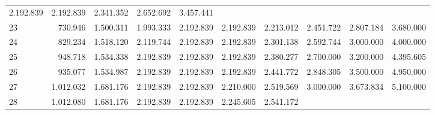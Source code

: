 \begin{tabular}{llllllllll}
  \multicolumn{1}{r}{2.192.839} &
  \multicolumn{1}{r}{2.192.839} &
  \multicolumn{1}{r}{2.341.352} &
  \multicolumn{1}{r}{2.652.692} &
  \multicolumn{1}{r}{3.457.441} \\
\multicolumn{1}{l}{\hspace{1em}23} &
  \multicolumn{1}{|r}{730.946} &
  \multicolumn{1}{r}{1.500.311} &
  \multicolumn{1}{r}{1.993.333} &
  \multicolumn{1}{r}{2.192.839} &
  \multicolumn{1}{r}{2.192.839} &
  \multicolumn{1}{r}{2.213.012} &
  \multicolumn{1}{r}{2.451.722} &
  \multicolumn{1}{r}{2.807.184} &
  \multicolumn{1}{r}{3.680.000} \\
\multicolumn{1}{l}{\hspace{1em}24} &
  \multicolumn{1}{|r}{829.234} &
  \multicolumn{1}{r}{1.518.120} &
  \multicolumn{1}{r}{2.119.744} &
  \multicolumn{1}{r}{2.192.839} &
  \multicolumn{1}{r}{2.192.839} &
  \multicolumn{1}{r}{2.301.138} &
  \multicolumn{1}{r}{2.592.744} &
  \multicolumn{1}{r}{3.000.000} &
  \multicolumn{1}{r}{4.000.000} \\
\multicolumn{1}{l}{\hspace{1em}25} &
  \multicolumn{1}{|r}{948.718} &
  \multicolumn{1}{r}{1.534.338} &
  \multicolumn{1}{r}{2.192.839} &
  \multicolumn{1}{r}{2.192.839} &
  \multicolumn{1}{r}{2.192.839} &
  \multicolumn{1}{r}{2.380.277} &
  \multicolumn{1}{r}{2.700.000} &
  \multicolumn{1}{r}{3.200.000} &
  \multicolumn{1}{r}{4.395.605} \\
\multicolumn{1}{l}{\hspace{1em}26} &
  \multicolumn{1}{|r}{935.077} &
  \multicolumn{1}{r}{1.534.987} &
  \multicolumn{1}{r}{2.192.839} &
  \multicolumn{1}{r}{2.192.839} &
  \multicolumn{1}{r}{2.192.839} &
  \multicolumn{1}{r}{2.441.772} &
  \multicolumn{1}{r}{2.848.305} &
  \multicolumn{1}{r}{3.500.000} &
  \multicolumn{1}{r}{4.950.000} \\
\multicolumn{1}{l}{\hspace{1em}27} &
  \multicolumn{1}{|r}{1.012.032} &
  \multicolumn{1}{r}{1.681.176} &
  \multicolumn{1}{r}{2.192.839} &
  \multicolumn{1}{r}{2.192.839} &
  \multicolumn{1}{r}{2.210.000} &
  \multicolumn{1}{r}{2.519.569} &
  \multicolumn{1}{r}{3.000.000} &
  \multicolumn{1}{r}{3.673.834} &
  \multicolumn{1}{r}{5.100.000} \\
\multicolumn{1}{l}{\hspace{1em}28} &
  \multicolumn{1}{|r}{1.012.080} &
  \multicolumn{1}{r}{1.681.176} &
  \multicolumn{1}{r}{2.192.839} &
  \multicolumn{1}{r}{2.192.839} &
  \multicolumn{1}{r}{2.245.605} &
  \multicolumn{1}{r}{2.541.172} &

\end{tabular}
